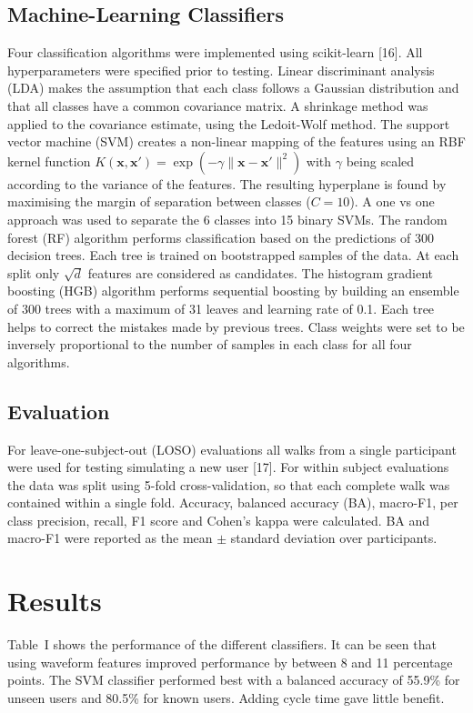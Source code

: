 \documentclass[conference]{IEEEtran}
\begin{document}
\subsection{Machine-Learning Classifiers}
Four classification algorithms were implemented using scikit-learn [16]. All hyperparameters were specified prior to testing. Linear discriminant analysis (LDA) makes the assumption that each class follows a Gaussian distribution and that all classes have a common covariance matrix. A shrinkage method was applied to the covariance estimate, using the Ledoit-Wolf method. The support vector machine (SVM) creates a non-linear mapping of the features using an RBF kernel function $K(\mathbf{x},\mathbf{x}')=\exp(-\gamma\lVert\mathbf{x}-\mathbf{x}'\rVert^2)$ with $\gamma$ being scaled according to the variance of the features. The resulting hyperplane is found by maximising the margin of separation between classes ($C=10$). A one vs one approach was used to separate the 6 classes into 15 binary SVMs. The random forest (RF) algorithm performs classification based on the predictions of 300 decision trees. Each tree is trained on bootstrapped samples of the data. At each split only $\sqrt{d}$ features are considered as candidates. The histogram gradient boosting (HGB) algorithm performs sequential boosting by building an ensemble of 300 trees with a maximum of 31 leaves and learning rate of 0.1. Each tree helps to correct the mistakes made by previous trees. Class weights were set to be inversely proportional to the number of samples in each class for all four algorithms.

\subsection{Evaluation}
For leave-one-subject-out (LOSO) evaluations all walks from a single participant were used for testing simulating a new user [17]. For within subject evaluations the data was split using 5-fold cross-validation, so that each complete walk was contained within a single fold. Accuracy, balanced accuracy (BA), macro-F1, per class precision, recall, F1 score and Cohen's kappa were calculated. BA and macro-F1 were reported as the mean $\pm$ standard deviation over participants.

\section{Results}
Table~I shows the performance of the different classifiers. It can be seen that using waveform features improved performance by between 8 and 11 percentage points. The SVM classifier performed best with a balanced accuracy of 55.9\% for unseen users and 80.5\% for known users. Adding cycle time gave little benefit.
\end{document}
